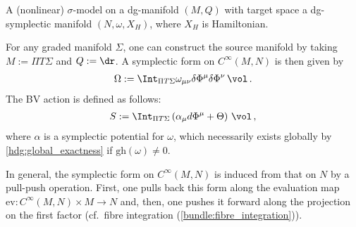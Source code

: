     \begin{example}
        A (nonlinear) $\sigma$-model on a dg-manifold $(M,Q)$ with target space a dg-symplectic manifold $(N,\omega,X_H)$, where $X_H$ is Hamiltonian.

        For any graded manifold $\Sigma$, one can construct the source manifold by taking $M:=\Pi T\Sigma$ and $Q:=\dr$. A symplectic form on $C^\infty(M,N)$ is then given by
        \begin{gather}
            \Omega := \Int_{\Pi T\Sigma}\omega_{\mu\nu}\delta\Phi^\mu\delta\Phi^\nu\,\vol\,.
        \end{gather}
        The BV action is defined as follows:
        \begin{gather}
            S := \Int_{\Pi T\Sigma}\left(\alpha_\mu d\Phi^\mu+\Theta\right)\,\vol\,,
        \end{gather}
        where $\alpha$ is a symplectic potential for $\omega$, which necessarily exists globally by \cref{hdg:global_exactness} if $\mathrm{gh}(\omega)\neq0$.

        In general, the symplectic form on $C^\infty(M,N)$ is induced from that on $N$ by a pull-push operation. First, one pulls back this form along the evaluation map $\mathrm{ev}:C^\infty(M,N)\times M\rightarrow N$ and, then, one pushes it forward along the projection on the first factor (cf.~fibre integration (\cref{bundle:fibre_integration})).

    \end{example}